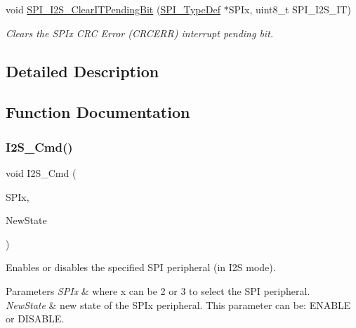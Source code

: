\begin{DoxyCompactItemize}
void \mbox{\hyperlink{group___s_p_i___private___functions_ga35a524a49ff3d058137060f751e8749f}{S\+P\+I\+\_\+\+I2\+S\+\_\+\+Clear\+I\+T\+Pending\+Bit}} (\mbox{\hyperlink{struct_s_p_i___type_def}{S\+P\+I\+\_\+\+Type\+Def}} $\ast$S\+P\+Ix, uint8\+\_\+t S\+P\+I\+\_\+\+I2\+S\+\_\+\+IT)
\begin{DoxyCompactList}\small\item\em Clears the S\+P\+Ix C\+RC Error (C\+R\+C\+E\+RR) interrupt pending bit. \end{DoxyCompactList}\end{DoxyCompactItemize}


\subsection{Detailed Description}


\subsection{Function Documentation}
\mbox{\label{group___s_p_i___private___functions_gafe061c71bbc5b4224f3f2884dc53739e}} 
\subsubsection{\texorpdfstring{I2S\_Cmd()}{I2S\_Cmd()}}
{\footnotesize\ttfamily void I2\+S\+\_\+\+Cmd (\begin{DoxyParamCaption}\item[{\mbox{\hyperlink{struct_s_p_i___type_def}{S\+P\+I\+\_\+\+Type\+Def}} $\ast$}]{S\+P\+Ix,  }\item[{\mbox{\hyperlink{group___exported__types_gac9a7e9a35d2513ec15c3b537aaa4fba1}{Functional\+State}}}]{New\+State }\end{DoxyParamCaption})}



Enables or disables the specified S\+PI peripheral (in I2S mode). 


\begin{DoxyParams}{Parameters}
{\em S\+P\+Ix} & where x can be 2 or 3 to select the S\+PI peripheral. \\
\hline
{\em New\+State} & new state of the S\+P\+Ix peripheral. This parameter can be\+: E\+N\+A\+B\+LE or D\+I\+S\+A\+B\+LE. \\
\hline
\end{DoxyParams}

